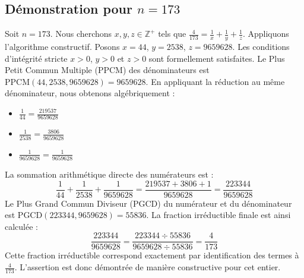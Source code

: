 \documentclass[11pt,a4paper]{article}
\begin{document}
\subsection{Démonstration pour $n = 173$}
Soit $n = 173$. Nous cherchons $x, y, z \in \mathbb{Z}^{+}$ tels que $\frac{4}{173} = \frac{1}{x} + \frac{1}{y} + \frac{1}{z}$.
Appliquons l'algorithme constructif. Posons $x = 44$, $y = 2538$, $z = 9659628$.
Les conditions d'intégrité stricte $x > 0$, $y > 0$ et $z > 0$ sont formellement satisfaites.
Le Plus Petit Commun Multiple (PPCM) des dénominateurs est $\text{PPCM}(44, 2538, 9659628) = 9659628$.
En appliquant la réduction au même dénominateur, nous obtenons algébriquement :
\begin{itemize}
    \item $\frac{1}{44} = \frac{219537}{9659628}$
    \item $\frac{1}{2538} = \frac{3806}{9659628}$
    \item $\frac{1}{9659628} = \frac{1}{9659628}$
\end{itemize}
La sommation arithmétique directe des numérateurs est :
$$ \frac{1}{44} + \frac{1}{2538} + \frac{1}{9659628} = \frac{219537 + 3806 + 1}{9659628} = \frac{223344}{9659628} $$
Le Plus Grand Commun Diviseur (PGCD) du numérateur et du dénominateur est $\text{PGCD}(223344, 9659628) = 55836$.
La fraction irréductible finale est ainsi calculée :
$$ \frac{223344}{9659628} = \frac{223344 \div 55836}{9659628 \div 55836} = \frac{4}{173} $$
Cette fraction irréductible correspond exactement par identification des termes à $\frac{4}{173}$. L'assertion est donc démontrée de manière constructive pour cet entier.
\end{document}
